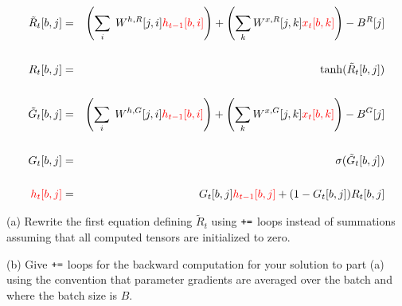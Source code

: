 \documentclass{article}
\newcommand{\solution}[1]{}
\begin{document}
\begin{eqnarray*}
\tilde{R}_t[b,j] & = & \left(\sum_i\;W^{h,R}[j,i]{\color{red} h_{t-1}[b,i]}\right) + \left(\sum_k W^{x,R}[j,k]{\color{red} x_t[b,k]}\right) - B^R[j] \\
\\
R_t[b,j] & = & \mathrm{\tanh}(\tilde{R}_t[b,j]) \\
\\
\tilde{G}_t[b,j] & = & \left(\sum_i\;W^{h,G}[j,i]{\color{red} h_{t-1}[b,i]}\right) + \left(\sum_k W^{x,G}[j,k]{\color{red} x_t[b,k]}\right) - B^G[j] \\
\\
G_t[b,j] & = & \mathrm{\sigma}(\tilde{G}_t[b,j]) \\
\\
{\color{red} h_t[b,j]} & = & G_t[b,j]{\color{red} h_{t-1}[b,j]} + (1-G_t[b,j])R_t[b,j]
\end{eqnarray*}

(a) Rewrite the first equation defining $\tilde{R}_t$ using $\mbox{\tt +=}$ loops instead of summations assuming that all computed tensors are initialized to zero.


\solution{
\begin{eqnarray*}
\mbox{for}\; b,j,i\;\tilde{R}_t[b,j] & \pluseq & W^{h,R}[j,i]h_{t-1}[b,i] \\
\\
\mbox{for}\;b,j,k\;\tilde{R}_t[b,j] & \pluseq & W^{X,R}[k,i]x_t[b,k] \\
\\
\mbox{for}\;b,j\;\tilde{R}_t[b,j] & \minuseq & B^R[j]
\end{eqnarray*}
}

\medskip
(b) Give $\mbox{\tt +=}$ loops for the backward computation for your solution to part (a) using the convention that
parameter gradients are averaged over the batch and where the batch size is $B$.

\solution{
\begin{eqnarray*}
\mbox{for}\; b,j,i\;W^{h,R}.\grad[j,i] & \pluseq & \frac{1}{B}\;h_{t-1}[b,i]\tilde{R}_t.\grad[b,j] \\
\\
\mbox{for}\; b,j,i\; h_{t-1}.\grad[b,j] & \pluseq & W^{h,R}[j,i]\tilde{R}_t.\grad[b,j] \\
\\
\mbox{for}\; b,j,k\;W^{x,R}.\grad[j,k] & \pluseq & \frac{1}{B}\;x[b,k]\tilde{R}_t.\grad[b,j] \\
\\
\mbox{for}\;b,j\;B^R.\grad[j] & \minuseq & \frac{1}{B}\;\tilde{R}_t.\grad[b,j]
\end{eqnarray*}
}
\end{document}
